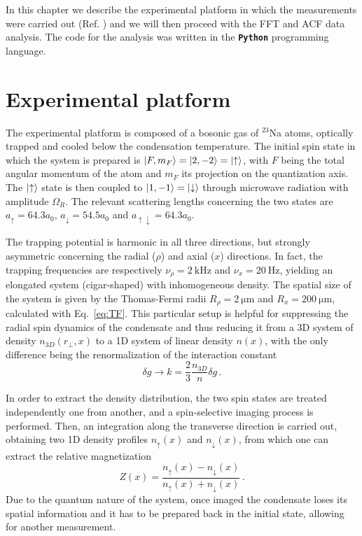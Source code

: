 In this chapter we describe the experimental platform in which the measurements were carried out (Ref. \cite{zenesini2024false}) and we will then proceed with the FFT and ACF data analysis. The code for the analysis was written in the \textbf{\texttt{Python}} programming language.

\section{Experimental platform}
The experimental platform is composed of a bosonic gas of $^{23}$Na atoms, optically trapped and cooled below the condensation temperature. The initial spin state in which the system is prepared is $\ket{F, m_F} = \ket{2, -2} = \ket{\uparrow}$, with $F$ being the total angular momentum of the atom 
and $m_F$ its projection on the quantization axis. The $\ket{\uparrow}$ state is then coupled to $\ket{1, -1} = \ket{\downarrow}$ through microwave radiation with amplitude $\Omega_R$. The relevant scattering lengths concerning the two states are $a_\uparrow = 64.3 a_0$, $a_\downarrow = 54.5 a_0$ and $a_{\uparrow\downarrow} = 64.3 a_0$.

The trapping potential is harmonic in all three directions, but strongly asymmetric concerning the radial ($\rho$) and axial ($x$) directions. In fact, the trapping frequencies are respectively $\nu_\rho = 2\ \unit{\kilo\hertz}$ and $\nu_x = 20\ \unit{\hertz}$, yielding an elongated system (cigar-shaped) with inhomogeneous density. The spatial size of the system is given by the Thomas-Fermi radii $R_\rho = 2\ \unit{\micro\meter}$ and $R_x = 200\ \unit{\micro\meter}$, calculated with Eq.\ \eqref{eq:TF}. This particular setup is helpful for suppressing the radial spin dynamics of the condensate and thus reducing it from a 3D system of density $n_{3D}(r_\perp,x)$ to a 1D system of linear density $n(x)$, with the only difference being the renormalization of the interaction constant
\[
    \delta g \to k = \frac{2}{3}\frac{n_{3D}}{n}\delta g\, .
\]

In order to extract the density distribution, the two spin states are treated independently one from another, and a spin-selective imaging process is performed. Then, an integration along the transverse direction is carried out, obtaining two 1D density profiles $n_\uparrow(x)$ and $n_\downarrow(x)$, from which one can extract the relative magnetization
\begin{equation}
    Z(x) = \frac{n_\uparrow(x) - n_\downarrow(x)}{n_\uparrow(x) + n_\downarrow(x)}\, .
    \label{eq:magnetization}
\end{equation}
Due to the quantum nature of the system, once imaged the condensate loses its spatial information and it has to be prepared back in the initial state, allowing for another measurement.

